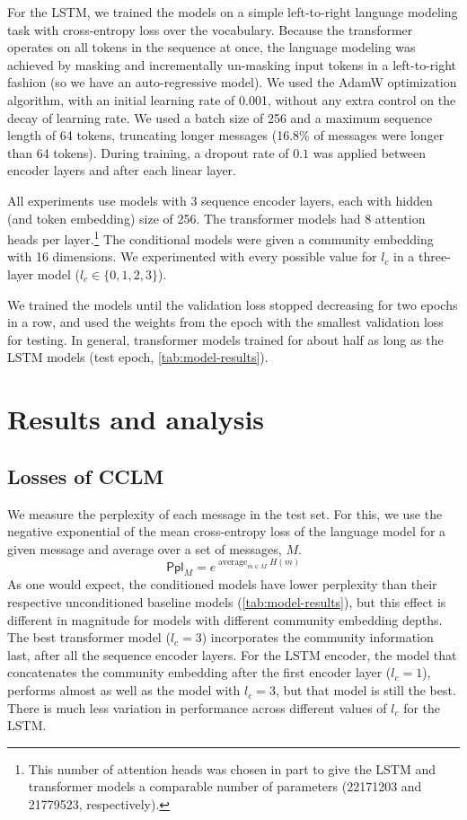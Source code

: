 \documentclass[11pt]{article}
\newcommand\Ppl{\mathsf{Ppl}}
\DeclareMathOperator*{\avg}{average}
\begin{document}
For the LSTM, we trained the models on a simple left-to-right language
modeling task with cross-entropy loss over the vocabulary.  Because
the transformer operates on all tokens in the sequence at once, the
language modeling was achieved by masking and incrementally un-masking
input tokens in a left-to-right fashion (so we have an
auto-regressive model).  We used the AdamW
\citep{Loshchilov2019} optimization algorithm, with an initial
learning rate of \num{0.001}, without any extra control on the decay
of learning rate.
%
We used a batch size of \num{256} and a maximum sequence length of
\num{64} tokens, truncating longer messages (16.8\% of messages were
longer than \num{64} tokens).  During training, a dropout rate of
$0.1$ was applied between encoder layers and after each linear layer.

All experiments use models with \num{3} sequence encoder layers,
each with hidden (and token embedding) size of \num{256}. 
The transformer models had \num{8} attention heads per layer.\footnote{
  This number of attention heads was chosen in part to give the LSTM and transformer
  models a comparable number of parameters 
  (\num{22171203} and \num{21779523}, respectively).}
The conditional models were given a community embedding with \num{16} dimensions. 
We experimented with every possible value for $l_c$ in a three-layer model ($l_c\in\{0,1,2,3\}$).

We trained the models until the validation loss stopped decreasing for
two epochs in a row, and used the weights from the epoch with the
smallest validation loss for testing.  In general, transformer models
trained for about half as long as the LSTM models (test epoch,
\cref{tab:model-results}).

\section{Results and analysis}

\subsection{Losses of CCLM}

We measure the perplexity of each message in the test set. 
For this, we use the negative exponential of the mean cross-entropy loss 
of the language model for a given message and average over a set of messages, $M$.
\[\Ppl_M = e^{\avg_{m\in M} H(m)}\]
As one would expect, 
the conditioned models have lower perplexity
than their respective unconditioned baseline models (\cref{tab:model-results}),
but this effect is different in magnitude
for models with different community embedding depths.
The best transformer model ($l_c=3$)
incorporates the community information last,
after all the sequence encoder layers.
For the LSTM encoder, 
the model that concatenates the community embedding after the first encoder layer ($l_c=1$),
performs almost as well as the model with $l_c=3$, but that model is still the best.
There is much less variation in performance across different values of $l_c$ for the LSTM.
\end{document}
